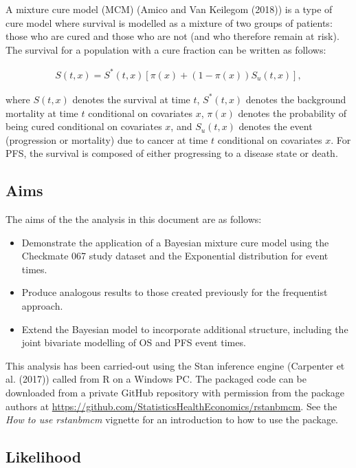 \documentclass[
]{article}
\providecommand{\tightlist}{%
  \setlength{\itemsep}{0pt}\setlength{\parskip}{0pt}}
\begin{document}
A mixture cure model (MCM) (Amico and Van Keilegom (2018)) is a type of
cure model where survival is modelled as a mixture of two groups of
patients: those who are cured and those who are not (and who therefore
remain at risk). The survival for a population with a cure fraction can
be written as follows:

\begin{align}
\tag{*}
S(t, x) = S^*(t, x)[\pi(x) + (1 − \pi(x))S_u(t, x)],
\end{align}

where \(S(t, x)\) denotes the survival at time \(t\), \(S^*(t, x)\)
denotes the background mortality at time \(t\) conditional on covariates
\(x\), \(\pi(x)\) denotes the probability of being cured conditional on
covariates \(x\), and \(S_u(t, x)\) denotes the event (progression or
mortality) due to cancer at time \(t\) conditional on covariates \(x\).
For PFS, the survival is composed of either progressing to a disease
state or death.

\hypertarget{aims}{%
\subsection{Aims}\label{aims}}

The aims of the the analysis in this document are as follows:

\begin{itemize}
\tightlist
\item
  Demonstrate the application of a Bayesian mixture cure model using the
  Checkmate 067 study dataset and the Exponential distribution for event
  times.
\item
  Produce analogous results to those created previously for the
  frequentist approach.
\item
  Extend the Bayesian model to incorporate additional structure,
  including the joint bivariate modelling of OS and PFS event times.
\end{itemize}

This analysis has been carried-out using the Stan inference engine
(Carpenter et al. (2017)) called from R on a Windows PC. The packaged
code can be downloaded from a private GitHub repository with permission
from the package authors at
\url{https://github.com/StatisticsHealthEconomics/rstanbmcm}. See the
\emph{How to use rstanbmcm} vignette for an introduction to how to use
the package.

\hypertarget{likelihood}{%
\subsection{Likelihood}\label{likelihood}}
\end{document}
